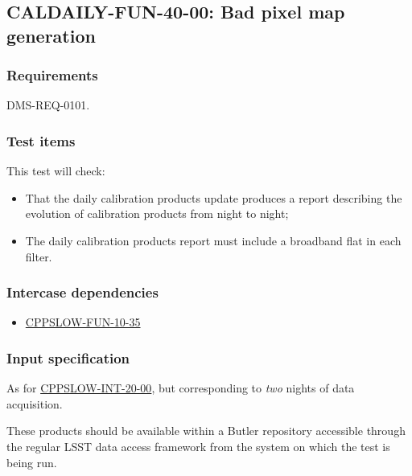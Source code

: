 \subsection{CALDAILY-FUN-40-00: Bad pixel map generation}
\label{caldaily-fun-40-00}

\subsubsection{Requirements}

DMS-REQ-0101.

\subsubsection{Test items}

This test will check:

\begin{itemize}

  \item{That the daily calibration products update produces a report
  describing the evolution of calibration products from night to night;}

  \item{The daily calibration products report must include a broadband flat in
  each filter.}

\end{itemize}

\subsubsection{Intercase dependencies}

\begin{itemize}

  \item{\hyperref[cppslow-fun-10-35]{CPPSLOW-FUN-10-35}}

\end{itemize}

\subsubsection{Input specification}

As for \hyperref[cppslow-int-20-00]{CPPSLOW-INT-20-00}, but corresponding to
\emph{two} nights of data acquisition.

These products should be available within a Butler repository accessible
through the regular LSST data access framework from the system on which the test
is being run.

